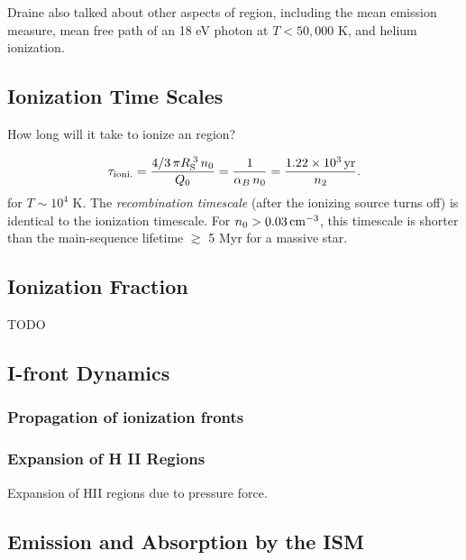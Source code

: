 Draine also talked about other aspects of region, including the mean emission measure, mean free path of an 18 eV photon at \(T<50,000\) K, and helium ionization.

\subsection{Ionization Time Scales}
\label{sec:org4aa160b}
How long will it take to ionize an region?

$$\tau_{{\rm ioni.}}=\frac{4/3\,\pi R_{{\rm
S}}^{\;3}\,n_{0}}{Q_{0}}=\frac{1}{\alpha_{B}\,n_{0}}=\frac{1.22\times10^{3}\,{\rm
yr}}{n_{2}}.$$
for \(T \sim 10^4\) K. The \emph{recombination timescale} (after the ionizing source turns off) is identical to the ionization timescale. For \(n_{0}>0.03\,{\rm cm}^{-3}\), this timescale is shorter than the main-sequence lifetime \(\gtrsim\) 5 Myr for a massive star.

\subsection{Ionization Fraction}
\label{sec:org08fb021}
TODO

\subsection{I-front Dynamics}
\label{sec:org6ec77da}
\subsubsection{Propagation of ionization fronts}
\label{sec:orge8c7c80}

\subsubsection{Expansion of H II Regions}
\label{sec:org401e905}
Expansion of HII regions due to pressure force.

\subsection{Emission and Absorption by the ISM}
\label{sec:org6c324ee}
